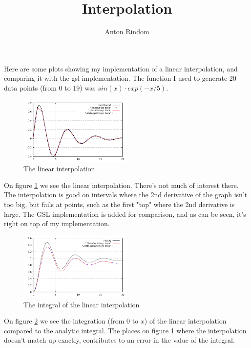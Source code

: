 \documentclass[a4paper,reprint,nofootinbib,aps,pra]{revtex4-1}
\begin{document}
\title{Interpolation}
\author{Anton Rindom}


\maketitle

Here are some plots showing my implementation of a linear interpolation, and comparing it with the gsl implementation.
The function I used to generate 20 data points (from 0 to 19) was $sin(x) \cdot exp(-x / 5)$. 

\begin{figure}[H]
    \centering
    \includegraphics[width=0.5\textwidth]{./tex/linterp.pdf}
    \caption{The linear interpolation}
    \label{fig:linterp}
\end{figure} 

On figure \ref{fig:linterp} we see the linear interpolation. There's not much of interest there.
The interpolation is good on intervals where the 2nd derivative of the graph isn't too big, but fails at points, such as the first "top" where the 2nd derivative is large.
The GSL implementation is added for comparison, and as can be seen, it's right on top of my implementation.
\begin{figure}[H]
    \centering
    \includegraphics[width=0.5\textwidth]{./tex/intlinterp.pdf}
    \caption{The integral of the linear interpolation}
    \label{fig:intlinterp}
\end{figure} 

On figure \ref{fig:intlinterp} we see the integration (from $0$ to $x$) of the linear interpolation compared to the analytic integral.
The places on figure \ref{fig:linterp} where the interpolation doesn't match up exactly, contributes to an error in the value of the integral.
\end{document}
